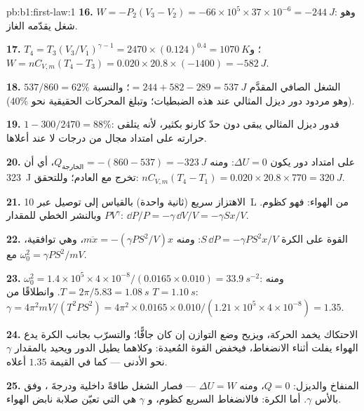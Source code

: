 \begin{solution}{pb:b1:first-law:1}
\textbf{16.} $W = -P_2(V_3 - V_2) = -66\times10^5 \times 37\times10^{-6} =
\qty{-244}{J}$: وهو شغل يقدّمه الغاز.

\textbf{17.} $T_4 = T_3(V_3/V_1)^{\gamma - 1} = 2470 \times (0.124)^{0.4} =
\qty{1070}{K}$؛ و $W = nC_{V,m}(T_4 - T_3) = 0.020 \times 20.8 \times (-1400) =
\qty{-582}{J}$.

\textbf{18.} الشغل الصافي المقدَّم $= 244 + 582 - 289 = \qty{537}{J}$؛ والنسبة
$537/860 = 62\%$ (وهو مردود دور ديزل المثالي عند هذه الضبطيات؛
وتبلغ المحركات الحقيقية نحو $40\%$).

\textbf{19.} $1 - 300/2470 = 88\%$: فدور ديزل المثالي يبقى دون
حدّ كارنو بكثير، لأنه يتلقى حرارته على امتداد مجال من
درجات  لا عند أعلاها.

\textbf{20.} على امتداد دور يكون $\Delta U = 0$: ومنه $Q_{\text{الخارجة}} = -(860 - 537) =
\qty{-323}{J}$، أي أن \qty{323}{J} تخرج مع العادم؛ وللتحقق:
$nC_{V,m}(T_4 - T_1) = 0.020 \times 20.8 \times 770 = \qty{320}{J}$.

\textbf{21.} الاهتزاز سريع (ثانية واحدة) بالقياس إلى توصيل
 عبر \qty{10}{L} من الهواء: فهو كظوم. وبالنشر الخطي
للمقدار $PV^\gamma$: $\dd P/P = -\gamma\,\dd V/V = -\gamma Sx/V$.

\textbf{22.} القوة على الكرة $S\,\dd P = -\gamma PS^2x/V$: ومنه $m\ddot x =
-(\gamma PS^2/V)x$، وهي توافقية، مع $\omega_0^2 = \gamma PS^2/mV$.

\textbf{23.} $\omega_0^2 = 1.4 \times 10^5 \times 4\times10^{-8}/(0.0165 \times 0.010)
= \qty{33.9}{s^{-2}}$: ومنه $T = 2\pi/5.83 = \qty{1.08}{s}$. وانطلاقًا من $T = \qty{1.10}{s}$:
$\gamma = 4\pi^2mV/(T^2PS^2) = 4\pi^2 \times 0.0165 \times 0.010/(1.21 \times 10^5
\times 4\times10^{-8}) = 1.35$.

\textbf{24.} الاحتكاك يخمد الحركة، ويزيح وضع التوازن إن كان
جافًّا؛ والتسرّب بجانب الكرة يدع الهواء يفلت أثناء الانضغاط،
فيخفض القوة المُعيدة: وكلاهما يطيل الدور ويحيد بالمقدار $\gamma$
نحو الأدنى --- كما في القيمة $1.35$ أعلاه.

\textbf{25.} المنفاخ والديزل: $Q = 0$، ومنه $\Delta U = W$ --- فصار الشغل
طاقةً داخلية ودرجةَ ، وفق  بالأس
$\gamma$. أما الكرة: فالانضغاط السريع كظوم، و $\gamma$ هي التي تعيّن
صلابة نابض الهواء.
\end{solution}

